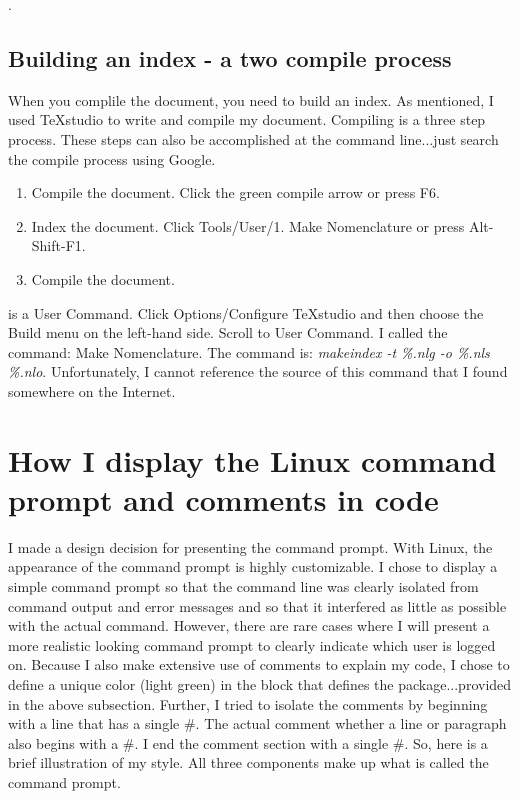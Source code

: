 .

\subsection{Building an index - a two compile process}

When you complile the \latex document, you need to build an index. As mentioned, I used TeXstudio to write and compile my document. Compiling is a three step process. These steps can also be accomplished at the command line...just search the \latex compile process using Google.

\begin{enumerate}
	\item{Compile the document. Click the green compile arrow or press F6.}
	\item{Index the document. Click Tools/User/1. Make Nomenclature or press Alt-Shift-F1.}
	\item{Compile the document.}
\end{enumerate}

 is a User Command. Click Options/Configure TeXstudio and then choose the Build menu on the left-hand side. Scroll to User Command. I called the command: Make Nomenclature. The command is: \textsl{makeindex -t \%.nlg -o \%.nls \%.nlo}. Unfortunately, I cannot reference the source of this command that I found somewhere on the Internet.

\section{How I display the Linux command prompt and comments in code}

I made a design decision for presenting the command prompt. With Linux, the appearance of the command prompt is highly customizable. I chose to display a simple command prompt so that the command line was clearly isolated from command output and error messages and so that it interfered as little as possible with the actual command. However, there are rare cases where I will present a more realistic looking command prompt to clearly indicate which user is logged on. Because I also make extensive use of comments to explain my code, I chose to define a unique color (light green) in the  block that defines the  package...provided in the above subsection. Further, I tried to isolate the comments by beginning with a line that has a single \#. The actual comment whether a line or paragraph also begins with a \#. I end the comment section with a single \#. So, here is a brief illustration of my style. All three components make up what is called the command prompt.

